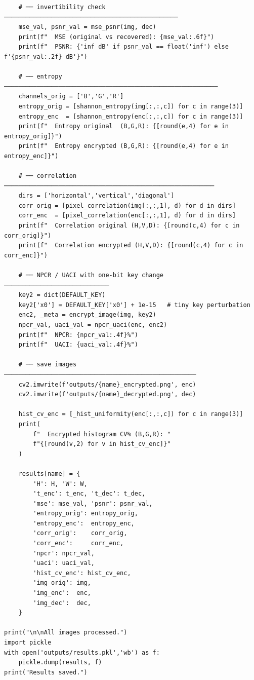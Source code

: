 \begin{verbatim}
    # ── invertibility check ────────────────────────────────────────────────
    mse_val, psnr_val = mse_psnr(img, dec)
    print(f"  MSE (original vs recovered): {mse_val:.6f}")
    print(f"  PSNR: {'inf dB' if psnr_val == float('inf') else f'{psnr_val:.2f} dB'}")

    # ── entropy ───────────────────────────────────────────────────────────
    channels_orig = ['B','G','R']
    entropy_orig = [shannon_entropy(img[:,:,c]) for c in range(3)]
    entropy_enc  = [shannon_entropy(enc[:,:,c]) for c in range(3)]
    print(f"  Entropy original  (B,G,R): {[round(e,4) for e in entropy_orig]}")
    print(f"  Entropy encrypted (B,G,R): {[round(e,4) for e in entropy_enc]}")

    # ── correlation ──────────────────────────────────────────────────────────
    dirs = ['horizontal','vertical','diagonal']
    corr_orig = [pixel_correlation(img[:,:,1], d) for d in dirs]
    corr_enc  = [pixel_correlation(enc[:,:,1], d) for d in dirs]
    print(f"  Correlation original (H,V,D): {[round(c,4) for c in corr_orig]}")
    print(f"  Correlation encrypted (H,V,D): {[round(c,4) for c in corr_enc]}")

    # ── NPCR / UACI with one-bit key change ─────────────────────────────
    key2 = dict(DEFAULT_KEY)
    key2['x0'] = DEFAULT_KEY['x0'] + 1e-15   # tiny key perturbation
    enc2, _meta = encrypt_image(img, key2)
    npcr_val, uaci_val = npcr_uaci(enc, enc2)
    print(f"  NPCR: {npcr_val:.4f}%")
    print(f"  UACI: {uaci_val:.4f}%")

    # ── save images ─────────────────────────────────────────────────────
    cv2.imwrite(f'outputs/{name}_encrypted.png', enc)
    cv2.imwrite(f'outputs/{name}_decrypted.png', dec)

    hist_cv_enc = [_hist_uniformity(enc[:,:,c]) for c in range(3)]
    print(
        f"  Encrypted histogram CV% (B,G,R): "
        f"{[round(v,2) for v in hist_cv_enc]}"
    )

    results[name] = {
        'H': H, 'W': W,
        't_enc': t_enc, 't_dec': t_dec,
        'mse': mse_val, 'psnr': psnr_val,
        'entropy_orig': entropy_orig,
        'entropy_enc':  entropy_enc,
        'corr_orig':    corr_orig,
        'corr_enc':     corr_enc,
        'npcr': npcr_val,
        'uaci': uaci_val,
        'hist_cv_enc': hist_cv_enc,
        'img_orig': img,
        'img_enc':  enc,
        'img_dec':  dec,
    }

print("\n\nAll images processed.")
import pickle
with open('outputs/results.pkl','wb') as f:
    pickle.dump(results, f)
print("Results saved.")



\end{verbatim}
